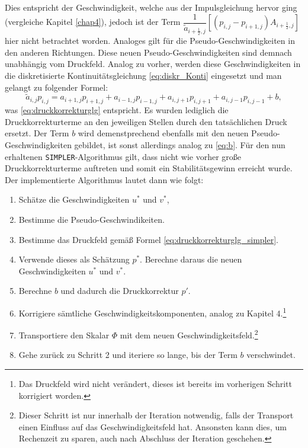 Dies entspricht der Geschwindigkeit, welche aus der Impulsgleichung hervor ging (vergleiche Kapitel \ref{chap4}), jedoch ist der Term $\dfrac{1}{\tilde{a}_{i+\frac{1}{2},j}}\left[\left(p_{i,j}-p_{i+1,j}\right)A_{i+\frac{1}{2},j}\right]$ hier nicht betrachtet worden. Analoges gilt f\"ur die Pseudo-Geschwindigkeiten in den anderen Richtungen. Diese neuen Pseudo-Geschwindigkeiten sind demnach unabh\"angig vom Druckfeld. Analog zu vorher, werden diese Geschwindigkeiten in die diskretisierte Kontinuit\"atsgleichung \eqref{eq:diskr_Konti} eingesetzt und man gelangt zu folgender Formel:
\begin{equation} \label{eq:druckkorrekturglg_simpler}
\tilde{a}_{i,j} p_{i,j} = a_{i+1,j} p_{i+1,j}+a_{i-1,j} p_{i-1,j}+a_{i,j+1} p_{i,j+1}+a_{i,j-1} p_{i,j-1}+b,
\end{equation}
was \eqref{eq:druckkorrekturglg} entspricht. Es wurden lediglich die Druckkorrekturterme an den jeweiligen Stellen durch den tats\"achlichen Druck ersetzt. Der Term $b$ wird demenstprechend ebenfalls mit den neuen Pseudo-Geschwindigkeiten gebildet, ist sonst allerdings analog zu \eqref{eq:b}. F\"ur den nun erhaltenen \texttt{SIMPLER}-Algorithmus gilt, dass nicht wie vorher gro\ss{}e Druckkorrekturterme auftreten und somit ein Stabilit\"atsgewinn erreicht wurde. Der implementierte Algorithmus lautet dann wie folgt:
\begin{enumerate}
\item Sch\"atze die Geschwindigkeiten $u^{*}$ und $v^{*}$,
\item Bestimme die Pseudo-Geschwindikeiten.
\item Bestimme das Druckfeld gem\"a\ss{} Formel \eqref{eq:druckkorrekturglg_simpler}.
\item Verwende dieses als Sch\"atzung $p^{*}$. Berechne daraus die neuen Geschwindigkeiten $u^{*}$ und $v^{*}$.
\item Berechne $b$ und dadurch die Druckkorrektur $p'$.
\item Korrigiere s\"amtliche Geschwindigkeitskomponenten, analog zu Kapitel 4.\footnote{Das Druckfeld wird nicht ver\"andert, dieses ist bereits im vorherigen Schritt korrigiert worden.}
\item Transportiere den Skalar $\Phi$ mit dem neuen Geschwindigkeitsfeld.\footnote{Dieser Schritt ist nur innerhalb der Iteration notwendig, falls der Transport einen Einfluss auf das Geschwindigkeitsfeld hat. Ansonsten kann dies, um Rechenzeit zu sparen, auch nach Abschluss der Iteration geschehen.}
\item Gehe zur\"uck zu Schritt 2 und iteriere so lange, bis der Term $b$ verschwindet.
\end{enumerate}
